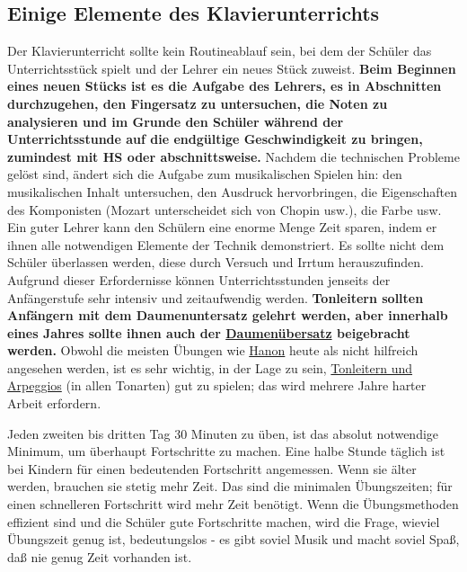 
\subsection{Einige Elemente des Klavierunterrichts}
\label{c1iii16d}

Der Klavierunterricht sollte kein Routineablauf sein, bei dem der Schüler das Unterrichtsstück spielt und der Lehrer ein neues Stück zuweist.
\textbf{Beim Beginnen eines neuen Stücks ist es die Aufgabe des Lehrers, es in Abschnitten durchzugehen, den Fingersatz zu untersuchen, die Noten zu analysieren und im Grunde den Schüler während der Unterrichtsstunde auf die endgültige Geschwindigkeit zu bringen, zumindest mit HS oder abschnittsweise.}
Nachdem die technischen Probleme gelöst sind, ändert sich die Aufgabe zum musikalischen Spielen hin: den musikalischen Inhalt untersuchen, den Ausdruck hervorbringen, die Eigenschaften des Komponisten (Mozart unterscheidet sich von Chopin usw.), die Farbe usw.
Ein guter Lehrer kann den Schülern eine enorme Menge Zeit sparen, indem er ihnen alle notwendigen Elemente der Technik demonstriert.
Es sollte nicht dem Schüler überlassen werden, diese durch Versuch und Irrtum herauszufinden.
Aufgrund dieser Erfordernisse können Unterrichtsstunden jenseits der Anfängerstufe sehr intensiv und zeitaufwendig werden.
\textbf{Tonleitern sollten Anfängern mit dem Daumenuntersatz gelehrt werden, aber innerhalb eines Jahres sollte ihnen auch der \hyperref[c1iii5b]{Daumenübersatz} beigebracht werden.}
Obwohl die meisten Übungen wie \hyperref[c1iii7h]{Hanon} heute als nicht hilfreich angesehen werden, ist es sehr wichtig, in der Lage zu sein, \hyperref[c1iii5]{Tonleitern und Arpeggios} (in allen Tonarten)
gut zu spielen; das wird mehrere Jahre harter Arbeit erfordern.

Jeden zweiten bis dritten Tag 30 Minuten zu üben, ist das absolut notwendige Minimum, um überhaupt Fortschritte zu machen.
Eine halbe Stunde täglich ist bei Kindern für einen bedeutenden Fortschritt angemessen.
Wenn sie älter werden, brauchen sie stetig mehr Zeit.
Das sind die minimalen Übungszeiten; für einen schnelleren Fortschritt wird mehr Zeit benötigt.
Wenn die Übungsmethoden effizient sind und die Schüler gute Fortschritte machen, wird die Frage, wieviel Übungszeit genug ist, bedeutungslos - es gibt soviel Musik und macht soviel Spaß, daß nie genug Zeit vorhanden ist.

